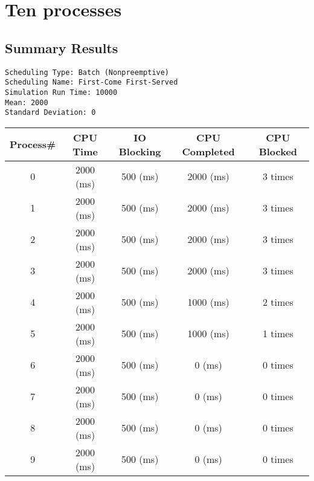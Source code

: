 \documentclass{report}
\begin{document}
\section{Ten processes}
\subsection{Summary Results}                                                   
\begin{lstlisting}
Scheduling Type: Batch (Nonpreemptive)
Scheduling Name: First-Come First-Served
Simulation Run Time: 10000
Mean: 2000
Standard Deviation: 0
\end{lstlisting}
\begin{center}                                                                 
\begin{tabular}{| c | c | c | c | c |}                                         
\hline                                                                         
Process\# &     CPU Time &      IO Blocking & CPU Completed & CPU Blocked \\
\hline
0		&2000 (ms)	&500 (ms)&	2000 (ms)&	3 times \\
\hline
1		&2000 (ms)	&500 (ms)&	2000 (ms)&	3 times \\
\hline
2		&2000 (ms)	&500 (ms)&	2000 (ms)&	3 times \\
\hline
3		&2000 (ms)	&500 (ms)&	2000 (ms)&	3 times \\
\hline
4		&2000 (ms)	&500 (ms)&	1000 (ms)&	2 times \\ 
\hline
5		&2000 (ms)	&500 (ms)&	1000 (ms)&	1 times \\
\hline
6		&2000 (ms)	&500 (ms)&	0 (ms)&		0 times \\
\hline
7		&2000 (ms)	&500 (ms)&	0 (ms)&		0 times \\
\hline
8		&2000 (ms)	&500 (ms)&	0 (ms)&		0 times \\
\hline
9		&2000 (ms)	&500 (ms)&	0 (ms)&		0 times \\
\hline
\end{tabular}
\end{center}
\end{document}
